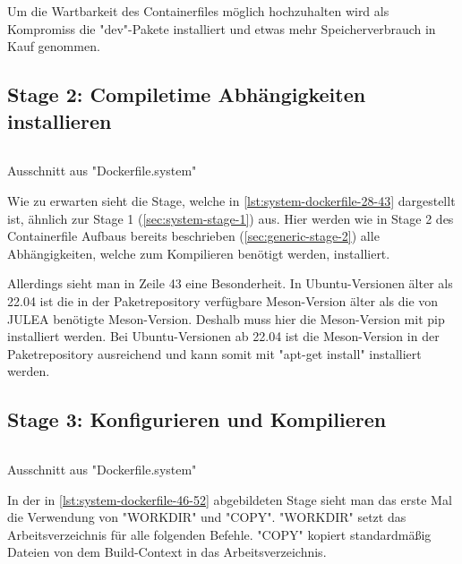 Um die Wartbarkeit des Containerfiles möglich hochzuhalten wird als Kompromiss die "dev"-Pakete installiert und etwas mehr Speicherverbrauch in Kauf genommen.

\pagebreak

\subsection{Stage 2: Compiletime Abhängigkeiten installieren} \label{sec:system-stage-2}

\begin{listing}[H]
    \inputminted[firstline=28,lastline=43]{dockerfile}{./code-examples/Dockerfile.system}
    \caption{Ausschnitt aus "Dockerfile.system"}
    \label{lst:system-dockerfile-28-43}
\end{listing}

Wie zu erwarten sieht die Stage, welche in \cref{lst:system-dockerfile-28-43} dargestellt ist, ähnlich zur Stage 1 (\cref{sec:system-stage-1}) aus. Hier werden wie in Stage 2 des Containerfile Aufbaus bereits beschrieben (\cref{sec:generic-stage-2}) alle Abhängigkeiten, welche zum Kompilieren benötigt werden, installiert. 

Allerdings sieht man in Zeile 43 eine Besonderheit. In Ubuntu-Versionen älter als 22.04 ist die in der Paketrepository verfügbare Meson-Version älter als die von JULEA benötigte Meson-Version. Deshalb muss hier die Meson-Version mit pip \cite{pythonInstallingPackagesPython} installiert werden. Bei Ubuntu-Versionen ab 22.04 ist die Meson-Version in der Paketrepository ausreichend und kann somit mit "apt-get install" installiert werden.

\subsection{Stage 3: Konfigurieren und Kompilieren} \label{sec:system-stage-3}

\begin{listing}[H]
    \inputminted[firstline=46,lastline=52]{dockerfile}{./code-examples/Dockerfile.system}
    \caption{Ausschnitt aus "Dockerfile.system"}
    \label{lst:system-dockerfile-46-52}
\end{listing}

In der in \cref{lst:system-dockerfile-46-52} abgebildeten Stage sieht man das erste Mal die Verwendung von "WORKDIR" und "COPY". "WORKDIR" setzt das Arbeitsverzeichnis für alle folgenden Befehle. "COPY" kopiert standardmäßig Dateien von dem Build-Context in das Arbeitsverzeichnis.


